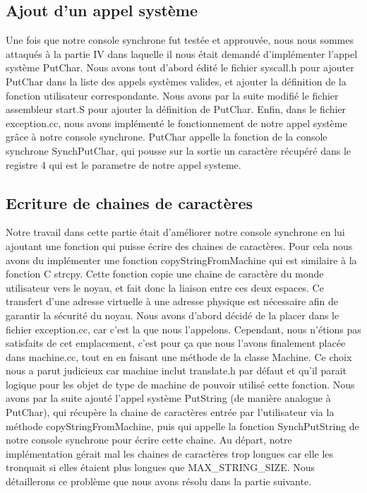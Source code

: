 \documentclass[12pt]{article}
\begin{document}
\subsection{Ajout d'un appel système}
Une fois que notre console synchrone fut testée et approuvée, nous nous sommes attaqués à la partie IV dans laquelle il nous était demandé d'implémenter l'appel système \textcolor{blue2}{PutChar}.
Nous avons tout d'abord édité le fichier \textcolor{vert2}{syscall.h} pour ajouter \textcolor{blue2}{PutChar} dans la liste des appels systèmes valides, et ajouter la définition de la fonction utilisateur correspondante.
Nous avons par la suite modifié le fichier assembleur \textcolor{vert2}{start.S} pour ajouter la définition de \textcolor{blue2}{PutChar}.
Enfin, dans le fichier \textcolor{vert2}{exception.cc}, nous avons implémenté le fonctionnement de notre appel système grâce à notre console synchrone. \textcolor{blue2}{PutChar} appelle la fonction de la console synchrone \textcolor{red2}{SynchPutChar}, qui pousse sur la sortie un caractère récupéré dans le registre 4 qui est le parametre de notre appel systeme.

\bigbreak
\subsection{Ecriture de chaines de caractères}
Notre travail dans cette partie était d'améliorer notre console synchrone en lui ajoutant une fonction qui puisse écrire des chaines de caractères. Pour cela nous avons du implémenter une fonction \textcolor{red2}{copyStringFromMachine} qui est similaire à la fonction C \textcolor{red2}{strcpy}. Cette fonction copie une chaine de caractère du monde utilisateur vers le noyau, et fait donc la liaison entre ces deux espaces.
Ce transfert d'une adresse virtuelle à une adresse physique est nécessaire afin de garantir la sécurité du noyau.
\newline
Nous avons d'abord décidé de la placer dans le fichier \textcolor{vert2}{exception.cc}, car c'est la que nous l'appelons. Cependant, nous n'étions pas satisfaits de cet emplacement, c'est pour ça que nous l'avons finalement placée dans \textcolor{vert2}{machine.cc}, tout en en faisant une méthode de la classe Machine.
Ce choix nous a parut judicieux car machine inclut translate.h par défaut et qu'il parait logique pour les objet de type de machine de pouvoir utilisé cette fonction.
\newline
Nous avons par la suite ajouté l'appel système \textcolor{blue2}{PutString} (de manière analogue à \textcolor{blue2}{PutChar}), qui récupère la chaine de caractères entrée par l'utilisateur via la méthode \textcolor{red2}{copyStringFromMachine}, puis qui appelle la fonction \textcolor{red2}{SynchPutString} de notre console synchrone pour écrire cette chaine.
Au départ, notre implémentation gérait mal les chaines de caractères trop longues car elle les tronquait si elles étaient plus longues que MAX\_STRING\_SIZE. Nous détaillerons ce problème que nous avons résolu dans la partie suivante.
\end{document}
